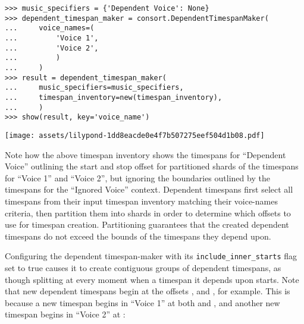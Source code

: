 \begin{abjadbookoutput}
\begin{singlespacing}
\vspace{-0.5\baselineskip}
\begin{verbatim}
>>> music_specifiers = {'Dependent Voice': None}
>>> dependent_timespan_maker = consort.DependentTimespanMaker(
...     voice_names=(
...         'Voice 1',
...         'Voice 2',
...         )
...     )
>>> result = dependent_timespan_maker(
...     music_specifiers=music_specifiers,
...     timespan_inventory=new(timespan_inventory),
...     )
>>> show(result, key='voice_name')
\end{verbatim}
\noindent\texttt{[image: assets/lilypond-1dd8eacde0e4f7b507275eef504d1b08.pdf]}
\end{singlespacing}
\end{abjadbookoutput}

\noindent Note how the above timespan inventory shows the timespans for
\enquote{Dependent Voice} outlining the start and stop offset for partitioned
shards of the timespans for \enquote{Voice 1} and \enquote{Voice 2}, but
ignoring the boundaries outlined by the timespans for the \enquote{Ignored
Voice} context. Dependent timespans first select all timespans from their input
timespan inventory matching their voice-names criteria, then partition them
into shards in order to determine which offsets to use for timespan creation.
Partitioning guarantees that the created dependent timespans do not exceed the
bounds of the timespans they depend upon.

Configuring the dependent timespan-maker with its
\texttt{include\_inner\_starts} flag set to true causes it to create contiguous
groups of dependent timespans, as though splitting at every moment when a
timespan it depends upon starts. Note that new dependent timespans begin at the
offsets ,  and , for example. This is
because a new timespan begins in \enquote{Voice 1} at both  and
, and another new timespan begins in \enquote{Voice 2} at
:

\begin{comment}
<abjad>
new_dependent_timespan_maker = new(
    dependent_timespan_maker,
    include_inner_starts=True,
    )
result = new_dependent_timespan_maker(
    music_specifiers=music_specifiers,
    timespan_inventory=new(timespan_inventory),
    )
show(result, key='voice_name')
</abjad>
\end{comment}

